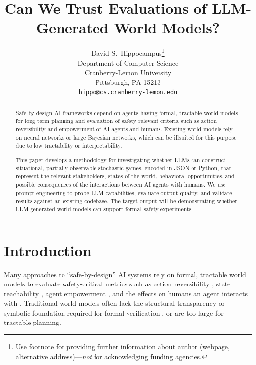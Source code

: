 \documentclass{article}
\title{Can We Trust Evaluations of LLM-Generated World Models?}
\author{%
  David S.~Hippocampus\thanks{Use footnote for providing further information
    about author (webpage, alternative address)---\emph{not} for acknowledging
    funding agencies.} \\
  Department of Computer Science\\
  Cranberry-Lemon University\\
  Pittsburgh, PA 15213 \\
  \texttt{hippo@cs.cranberry-lemon.edu} \\
}
\begin{document}
\maketitle


\begin{abstract}
  Safe-by-design AI frameworks depend on agents having formal, tractable world models for long-term planning and evaluation of safety-relevant criteria such as action reversibility and empowerment of AI agents and humans. Existing world models rely on neural networks or large Bayesian networks, which can be illsuited for this purpose due to low tractability or interpretability. 
  
  This paper develops a methodology for investigating whether LLMs can construct situational, partially observable stochastic games, encoded in JSON or Python, that represent the relevant stakeholders, states of the world, behavioral opportunities, and possible consequences of the interactions between AI agents with humans. We use prompt engineering to probe LLM capabilities, evaluate output quality, and validate results against an existing codebase. The target output will be demonstrating whether LLM-generated world models can support formal safety experiments.
\end{abstract}

\section{Introduction}
\label{sec:intro}
Many approaches to ``safe-by-design'' AI systems \citep{dalrymple2024guaranteedsafeaiframework} rely on formal, tractable world models to evaluate safety-critical metrics such as action reversibility \citep{eysenbach2018leave}, state reachability \citep{krakovna2020avoiding}, agent empowerment \citep{klyubin2005empowerment}, and the effects on humans an agent interacts with \citep{salge2017empowerment,heitzigfair}. 
Traditional world models \citep{amodei2016concrete,ha2018world} often lack the structural transparency or symbolic foundation required for formal verification  \citep{konidaris2018from}, or are too large for tractable planning. 
\end{document}
